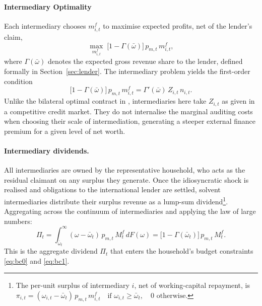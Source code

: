 \documentclass[11pt]{article}
\theoremstyle{definition}
\theoremstyle{plain}
\theoremstyle{remark}
\newcommand{\mf}{m^{f}}
\newcommand{\Mf}{M^{f}}
\begin{document}
\paragraph{Intermediary Optimality} Each intermediary chooses $\mf_{i,t}$ to maximise expected profits, net of the lender's claim,
\begin{equation}\label{eq:int_obj}
\max_{\mf_{i,t}} \; \bigl[1 - \Gamma(\bar{\omega})\bigr]\,p_{m,t}\,\mf_{i,t},
\end{equation}
where $\Gamma({\bar \omega})$ denotes the expected gross revenue share to the lender, defined formally in Section~\ref{sec:lender}. The intermediary problem yields the first-order condition
\begin{equation}\label{eq:int_foc}
\bigl[1 - \Gamma(\bar{\omega})\bigr]\,p_{m,t}\,\mf_{i,t} = \Gamma'(\bar{\omega})\,Z_{i,t}\,n_{i,t}.
\end{equation}
Unlike the bilateral optimal contract in \citet{christiano_risk_2014}, intermediaries here take $Z_{i,t}$ as given in a competitive credit market. They do not internalise the marginal auditing costs when choosing their scale of intermediation, generating a steeper external finance premium for a given level of net worth.


\paragraph{Intermediary dividends.} All intermediaries are owned by the representative household, who acts as the residual claimant on any surplus they generate. Once the idiosyncratic shock is realised and obligations to the international lender are settled, solvent intermediaries distribute their surplus revenue as a lump-sum dividend\footnote{The per-unit surplus of intermediary $i$, net of working-capital repayment, is $\pi_{i,t} = (\omega_{i,t} - \bar{\omega}_t)\,p_{m,t}\,\mf_{i,t} \quad \text{if } \omega_{i,t} \geq \bar{\omega}_t, \quad 0 \text{ otherwise}.$}. Aggregating across the continuum of intermediaries and applying the law of large numbers:
\begin{equation}\label{eq:Pi_agg}
\Pi_t = \int_{\bar{\omega}_t}^{\infty} (\omega - \bar{\omega}_t)\,p_{m,t}\,\Mf_t\,dF(\omega) = \bigl[1 - \Gamma(\bar{\omega}_t)\bigr]\,p_{m,t}\,\Mf_t.
\end{equation}
This is the aggregate dividend $\Pi_t$ that enters the household's budget constraints \eqref{eq:bc0} and \eqref{eq:bc1}.
\end{document}
